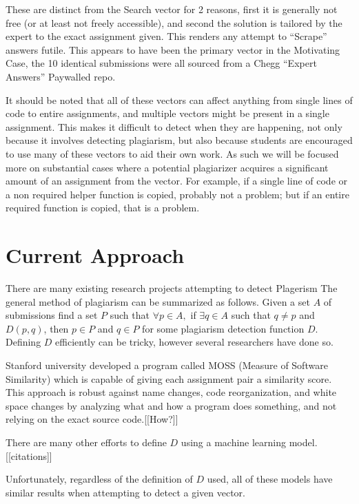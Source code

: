 \documentclass[conference]{IEEEtran}
\newcommand{\n}{\hfill\break}
\begin{document}
\begin{itemize}
\begin{itemize}
	
	\end{itemize} These are distinct from the Search vector for 2 reasons, first it is generally not free (or at least not freely accessible), and second the solution is tailored by the expert to the exact assignment given.  This renders any attempt to ``Scrape'' answers futile.
	This appears to have been the primary vector in the Motivating Case, the 10 identical submissions were all sourced from a Chegg ``Expert Answers'' Paywalled repo.
\end{itemize}
 It should be noted that all of these vectors can affect anything from single lines of code to entire assignments, and multiple vectors might be present in a single assignment.
	This makes it difficult to detect when they are happening, not only because it involves detecting plagiarism, but also because students are encouraged to use many of these vectors to aid their own work.  As such we will be focused more on substantial cases where a potential plagiarizer acquires a significant amount of an assignment from the vector.  For example, if a single line of code or a non required helper function is copied, probably not a problem; but if an entire required function is copied, that is a problem.

\n\section{\textbf{Current Approach}}
	There are many existing research projects attempting to detect Plagerism The general method of plagiarism can be summarized as follows.  Given a set $A$ of submissions find a set $P$ such that  $\forall p\in A,$ if $\exists q\in A$ such that $q\not=p$ and $D(p,q)$, then $p\in P$ and $q\in P$ for some plagiarism detection function $D$.  Defining $D$ efficiently can be tricky, however several researchers have done so.
	
		Stanford university developed a program called MOSS (Measure of Software Similarity) which is capable of giving each assignment pair a similarity score. This approach is robust against name changes, code reorganization, and white space changes by analyzing what and how a program does something, and not relying on the exact source code.[[How?]]
	
	
	There are many other efforts to define $D$ using a machine learning model.[[citations]]
	
	Unfortunately, regardless of the definition of $D$ used, all of these models have similar results when attempting to detect a given vector.
\end{document}
